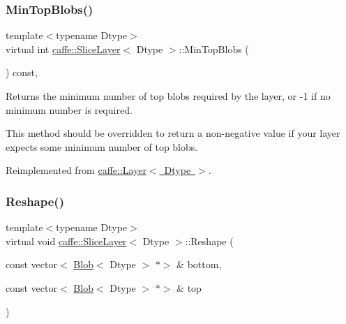 \subsubsection{\texorpdfstring{Min\+Top\+Blobs()}{MinTopBlobs()}\hspace{0.1cm}{\footnotesize\ttfamily [2/2]}}
{\footnotesize\ttfamily template$<$typename Dtype$>$ \\
virtual int \mbox{\hyperlink{classcaffe_1_1_slice_layer}{caffe\+::\+Slice\+Layer}}$<$ Dtype $>$\+::Min\+Top\+Blobs (\begin{DoxyParamCaption}{ }\end{DoxyParamCaption}) const\hspace{0.3cm}{\ttfamily [inline]}, {\ttfamily [virtual]}}



Returns the minimum number of top blobs required by the layer, or -\/1 if no minimum number is required. 

This method should be overridden to return a non-\/negative value if your layer expects some minimum number of top blobs. 

Reimplemented from \mbox{\hyperlink{classcaffe_1_1_layer_ab9e4c8d642e413948b131d851a8462a4}{caffe\+::\+Layer$<$ Dtype $>$}}.

\mbox{\label{classcaffe_1_1_slice_layer_ac6fce397efbab95848f56be7b4f6a786}} 
\subsubsection{\texorpdfstring{Reshape()}{Reshape()}\hspace{0.1cm}{\footnotesize\ttfamily [1/2]}}
{\footnotesize\ttfamily template$<$typename Dtype$>$ \\
virtual void \mbox{\hyperlink{classcaffe_1_1_slice_layer}{caffe\+::\+Slice\+Layer}}$<$ Dtype $>$\+::Reshape (\begin{DoxyParamCaption}\item[{const vector$<$ \mbox{\hyperlink{classcaffe_1_1_blob}{Blob}}$<$ Dtype $>$ $\ast$$>$ \&}]{bottom,  }\item[{const vector$<$ \mbox{\hyperlink{classcaffe_1_1_blob}{Blob}}$<$ Dtype $>$ $\ast$$>$ \&}]{top }\end{DoxyParamCaption})\hspace{0.3cm}{\ttfamily [virtual]}}



